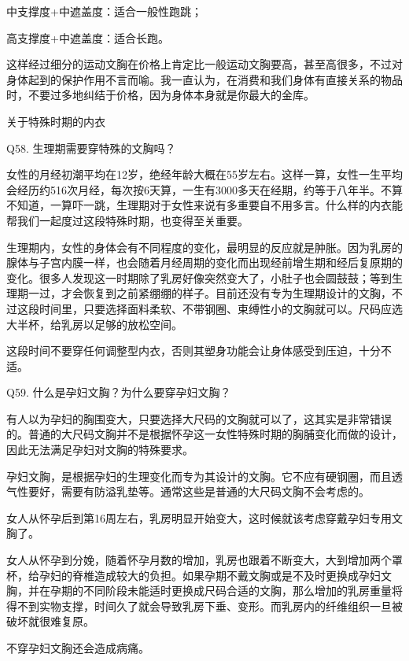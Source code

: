 \documentclass[12pt,UTF8]{ctexbook}
\begin{document}
中支撑度+中遮盖度：适合一般性跑跳；

高支撑度+中遮盖度：适合长跑。



这样经过细分的运动文胸在价格上肯定比一般运动文胸要高，甚至高很多，不过对身体起到的保护作用不言而喻。我一直认为，在消费和我们身体有直接关系的物品时，不要过多地纠结于价格，因为身体本身就是你最大的金库。





关于特殊时期的内衣


Q58. 生理期需要穿特殊的文胸吗？


女性的月经初潮平均在12岁，绝经年龄大概在55岁左右。这样一算，女性一生平均会经历约516次月经，每次按6天算，一生有3000多天在经期，约等于八年半。不算不知道，一算吓一跳，生理期对于女性来说有多重要自不用多言。什么样的内衣能帮我们一起度过这段特殊时期，也变得至关重要。

生理期内，女性的身体会有不同程度的变化，最明显的反应就是肿胀。因为乳房的腺体与子宫内膜一样，也会随着月经周期的变化而出现经前增生期和经后复原期的变化。很多人发现这一时期除了乳房好像突然变大了，小肚子也会圆鼓鼓；等到生理期一过，才会恢复到之前紧绷绷的样子。目前还没有专为生理期设计的文胸，不过这段时间里，只要选择面料柔软、不带钢圈、束缚性小的文胸就可以。尺码应选大半杯，给乳房以足够的放松空间。

这段时间不要穿任何调整型内衣，否则其塑身功能会让身体感受到压迫，十分不适。





Q59. 什么是孕妇文胸？为什么要穿孕妇文胸？


有人以为孕妇的胸围变大，只要选择大尺码的文胸就可以了，这其实是非常错误的。普通的大尺码文胸并不是根据怀孕这一女性特殊时期的胸脯变化而做的设计，因此无法满足孕妇对文胸的特殊要求。

孕妇文胸，是根据孕妇的生理变化而专为其设计的文胸。它不应有硬钢圈，而且透气性要好，需要有防溢乳垫等。通常这些是普通的大尺码文胸不会考虑的。

女人从怀孕后到第16周左右，乳房明显开始变大，这时候就该考虑穿戴孕妇专用文胸了。


女人从怀孕到分娩，随着怀孕月数的增加，乳房也跟着不断变大，大到增加两个罩杯，给孕妇的脊椎造成较大的负担。如果孕期不戴文胸或是不及时更换成孕妇文胸，并在孕期的不同阶段未能适时更换成尺码合适的文胸，那么增加的乳房重量将得不到实物支撑，时间久了就会导致乳房下垂、变形。而乳房内的纤维组织一旦被破坏就很难复原。

不穿孕妇文胸还会造成病痛。
\end{document}
